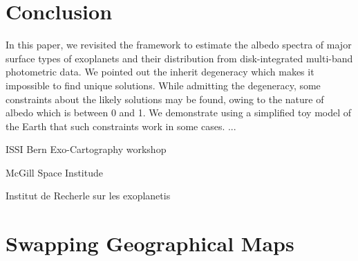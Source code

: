 \documentclass[iop,numberedappendix,apj,]{emulateapj}
\begin{document}
\section{Conclusion}
\label{s:conclusion}

In this paper, we revisited the framework to estimate the albedo spectra of major surface types of exoplanets and their distribution from disk-integrated multi-band photometric data. 
We pointed out the inherit degeneracy which makes it impossible to find unique solutions. 
While admitting the degeneracy, some constraints about the likely solutions may be found, owing to the nature of albedo which is between 0 and 1. 
We demonstrate using a simplified toy model of the Earth that such constraints work in some cases. 
...


\acknowledgements

ISSI Bern Exo-Cartography workshop

McGill Space Institude

Institut de Recherle sur les exoplanetis 




\appendix


\section{Swapping Geographical Maps}
\end{document}
